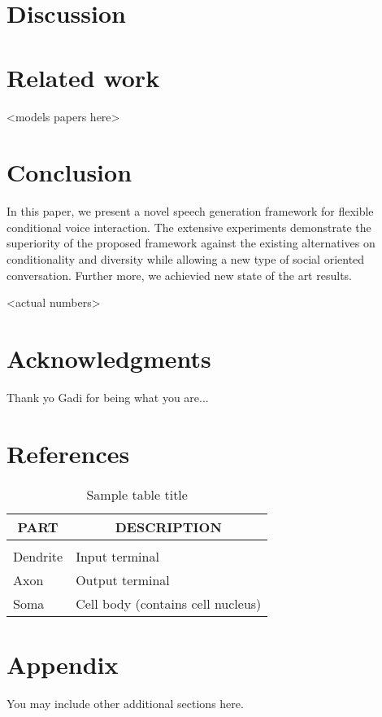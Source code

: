 \documentclass[11pt,a4paper]{article}
\begin{document}
\section{Discussion}

\section{Related work}
<models papers here> 

\section{Conclusion}
In this paper, we present a novel speech generation framework for flexible conditional voice interaction. 
The extensive experiments demonstrate the superiority of the proposed framework against the existing alternatives on conditionality and diversity while allowing a new type of social oriented conversation.
Further more, we achievied new state of the art results. 

<actual numbers>

\section{Acknowledgments}
Thank yo Gadi for being what you are...

\section{References}


\begin{table}[t]
\caption{Sample table title}
\label{sample-table}
\begin{center}
\begin{tabular}{ll}
\multicolumn{1}{c}{\bf PART}  &\multicolumn{1}{c}{\bf DESCRIPTION}
\\ \hline \\
Dendrite         &Input terminal \\
Axon             &Output terminal \\
Soma             &Cell body (contains cell nucleus) \\
\end{tabular}
\end{center}
\end{table}






\appendix
\section{Appendix}
You may include other additional sections here. 
\end{document}
